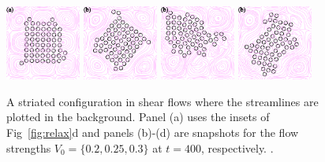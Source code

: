 \documentclass[aps,prl,preprint,groupedaddress]{revtex4-2}
\begin{document}
\begin{figure}
  \begin{center}
  \includegraphics[width=0.22\textwidth]{CTG_0.pdf}
  \includegraphics[width=0.22\textwidth]{CTG_1.pdf}
  \includegraphics[width=0.22\textwidth]{CTG_2.pdf} 
    \includegraphics[width=0.22\textwidth]{CTG_3.pdf} 
  \end{center}
  \vspace{-20pt}  
  \caption{\label{fig:BC3_TG_flow}  A striated configuration in shear flows where the streamlines are plotted in the background. Panel (a) uses the insets of Fig~\ref{fig:relax}d and panels (b)-(d) are snapshots for the flow strengths $V_0=\{0.2, 0.25, 0.3\}$ at $t=400$, respectively. . }
\end{figure}
\end{document}

